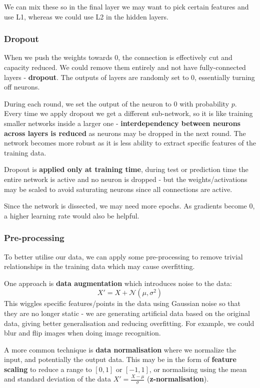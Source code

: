 \documentclass[11pt]{article}
\begin{document}
We can mix these so in the final layer we may want to pick certain features and use L1, whereas we could use L2 in the hidden layers.

\subsubsection{Dropout}
When we push the weights towards 0, the connection is effectively cut and capacity reduced.
We could remove them entirely and not have fully-connected layers - \textbf{dropout}.
The outputs of layers are randomly set to 0, essentially turning off neurons.

During each round, we set the output of the neuron to 0 with probability $p$.
Every time we apply dropout we get a different sub-network, so it is like training smaller networks inside a larger one - \textbf{interdependency between neurons across layers is reduced} as neurons may be dropped in the next round.
The network becomes more robust as it is less ability to extract specific features of the training data.

Dropout is \textbf{applied only at training time}, during test or prediction time the entire network is active and no neuron is dropped - but the weights/activations may be scaled to avoid saturating neurons since all connections are active.

Since the network is dissected, we may need more epochs.
As gradients become 0, a higher learning rate would also be helpful.

\subsubsection{Pre-processing}
To better utilise our data, we can apply some pre-processing to remove trivial relationships in the training data which may cause overfitting.

One approach is \textbf{data augmentation} which introduces noise to the data:
\[
  X' = X + \mathcal{N}(\mu, \sigma^2) 
\]
This wiggles specific features/points in the data using Gaussian noise so that they are no longer static - we are generating artificial data based on the original data, giving better generalisation and reducing overfitting.
For example, we could blur and flip images when doing image recognition.

A more common technique is \textbf{data normalisation} where we normalize the input, and potentially the output data.
This may be in the form of \textbf{feature scaling} to reduce a range to $[0, 1]$ or $[-1, 1]$, or normalising using the mean and standard deviation of the data $X' = \frac{X - \mu}{\sigma}$ (\textbf{z-normalisation}).
\end{document}
